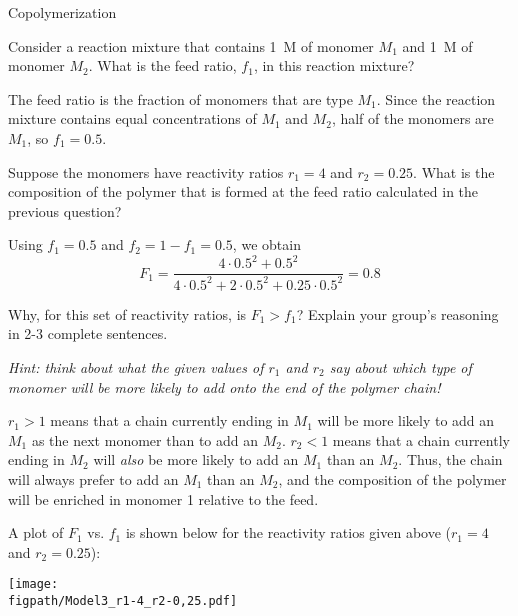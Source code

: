 \begin{activity}{Copolymerization}
\begin{model}
\end{model}

\begin{ctqs}
	\question Consider a reaction mixture that contains 1~M of monomer $M_1$ and 1~M of monomer $M_2$.  What is the feed ratio, $f_1$, in this reaction mixture?
	
		\begin{solution}[0.5in]{}
			The feed ratio is the fraction of monomers that are type $M_1$.  Since the reaction mixture contains equal concentrations of $M_1$ and $M_2$, half of the monomers are $M_1$, so $f_1=0.5$.
		\end{solution}
	
	\question Suppose the monomers have reactivity ratios $r_1=4$ and $r_2=0.25$.  What is the composition of the polymer that is formed at the feed ratio calculated in the previous question?
	
		\begin{solution}[1in]{}
			Using $f_1=0.5$ and $f_2=1-f_1 = 0.5$, we obtain
			\begin{equation*}
				F_1 = \frac{4\cdot 0.5^2 + 0.5^2}{4\cdot 0.5^2+2\cdot 0.5^2 + 0.25\cdot 0.5^2} = 0.8
			\end{equation*}
		\end{solution}
	
	\question Why, for this set of reactivity ratios, is $F_1 > f_1$?  Explain your group's reasoning in 2-3 complete sentences.
	
		\emph{Hint: think about what the given values of $r_1$ and $r_2$ say about which type of monomer will be more likely to add onto the end of the polymer chain!}
	
		\begin{solution}[1.5in]{}
			$r_1>1$ means that a chain currently ending in $M_1$ will be more likely to add an $M_1$ as the next monomer than to add an $M_2$.  $r_2<1$ means that a chain currently ending in $M_2$ will \emph{also} be more likely to add an $M_1$ than an $M_2$.  Thus, the chain will always prefer to add an $M_1$ than an $M_2$, and the composition of the polymer will be enriched in monomer 1 relative to the feed.
		\end{solution}

	\question \label{\labelbase:ctq:f1F1plot} A plot of $F_1$ vs. $f_1$ is shown below for the reactivity ratios given above ($r_1 = 4$ and $r_2=0.25$): 
	
		\vspace{3pt}
		\centerline{\texttt{[image: \\figpath/Model3\_r1-4\_r2-0,25.pdf]}}
	

\end{ctqs}
\end{activity}
